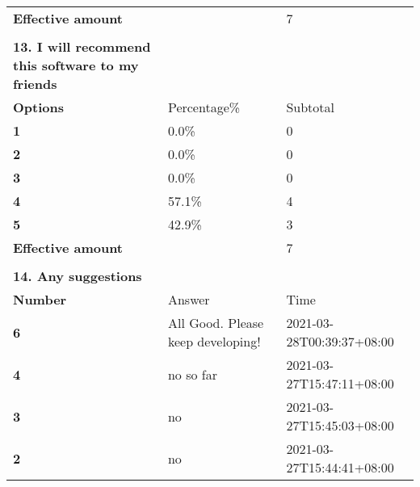 \documentclass[
]{article}
\begin{document}
\begin{longtable}[]{@{}lll@{}}
\textbf{Effective amount} & & 7 \\
& & \\
\textbf{13. I will recommend this software to my friends} & & \\
\textbf{Options} & Percentage\% & Subtotal \\
\textbf{1} & 0.0\% & 0 \\
\textbf{2} & 0.0\% & 0 \\
\textbf{3} & 0.0\% & 0 \\
\textbf{4} & 57.1\% & 4 \\
\textbf{5} & 42.9\% & 3 \\
\textbf{Effective amount} & & 7 \\
& & \\
\textbf{14. Any suggestions } & & \\
\textbf{Number} & Answer & Time \\
\textbf{6} & All Good. Please keep developing! &
2021-03-28T00:39:37+08:00 \\
\textbf{4} & no so far & 2021-03-27T15:47:11+08:00 \\
\textbf{3} & no & 2021-03-27T15:45:03+08:00 \\
\textbf{2} & no & 2021-03-27T15:44:41+08:00 \\
\bottomrule
\end{longtable}
\end{document}

